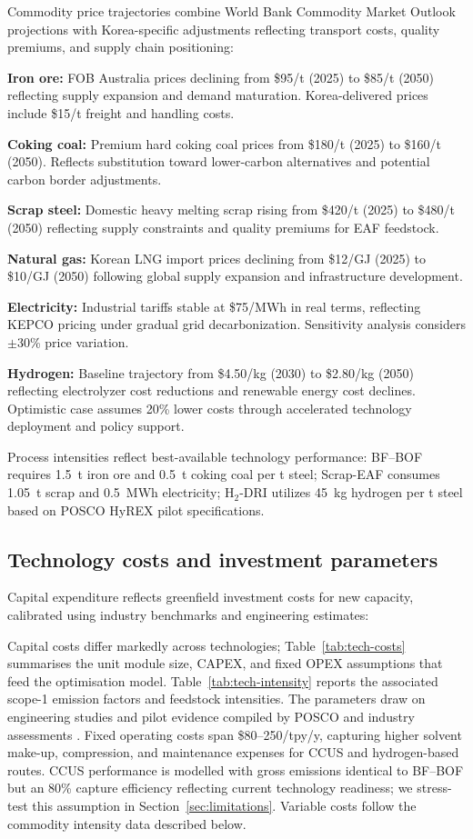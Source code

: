 \documentclass[preprint,1p,authoryear]{elsarticle}
\begin{document}
Commodity price trajectories combine World Bank Commodity Market Outlook projections with Korea-specific adjustments reflecting transport costs, quality premiums, and supply chain positioning:

\textbf{Iron ore:} FOB Australia prices declining from \$95/t (2025) to \$85/t (2050) reflecting supply expansion and demand maturation. Korea-delivered prices include \$15/t freight and handling costs.

\textbf{Coking coal:} Premium hard coking coal prices from \$180/t (2025) to \$160/t (2050). Reflects substitution toward lower-carbon alternatives and potential carbon border adjustments.

\textbf{Scrap steel:} Domestic heavy melting scrap rising from \$420/t (2025) to \$480/t (2050) reflecting supply constraints and quality premiums for EAF feedstock.

\textbf{Natural gas:} Korean LNG import prices declining from \$12/GJ (2025) to \$10/GJ (2050) following global supply expansion and infrastructure development.

\textbf{Electricity:} Industrial tariffs stable at \$75/MWh in real terms, reflecting KEPCO pricing under gradual grid decarbonization. Sensitivity analysis considers $\pm$30\% price variation.

\textbf{Hydrogen:} Baseline trajectory from \$4.50/kg (2030) to \$2.80/kg (2050) reflecting electrolyzer cost reductions and renewable energy cost declines. Optimistic case assumes 20\% lower costs through accelerated technology deployment and policy support.

Process intensities reflect best-available technology performance: BF--BOF requires 1.5~t iron ore and 0.5~t coking coal per t steel; Scrap-EAF consumes 1.05~t scrap and 0.5~MWh electricity; H$_2$-DRI utilizes 45~kg hydrogen per t steel based on POSCO HyREX pilot specifications.

\subsection{Technology costs and investment parameters}

Capital expenditure reflects greenfield investment costs for new capacity, calibrated using industry benchmarks and engineering estimates:

Capital costs differ markedly across technologies; Table~\ref{tab:tech-costs} summarises the unit module size, CAPEX, and fixed OPEX assumptions that feed the optimisation model. Table~\ref{tab:tech-intensity} reports the associated scope-1 emission factors and feedstock intensities. The parameters draw on engineering studies and pilot evidence compiled by POSCO and industry assessments \citep{MaterialEconomics2019,kuramochi2018beyond,prammer2021steel}. Fixed operating costs span \$80--250/tpy/y, capturing higher solvent make-up, compression, and maintenance expenses for CCUS and hydrogen-based routes. CCUS performance is modelled with gross emissions identical to BF--BOF but an 80\% capture efficiency reflecting current technology readiness; we stress-test this assumption in Section~\ref{sec:limitations}. Variable costs follow the commodity intensity data described below.
\end{document}
